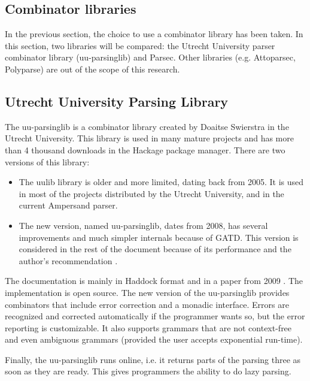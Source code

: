 \subsection{Combinator libraries}
In the previous section, the choice to use a combinator library has been taken.
In this section, two libraries will be compared: the Utrecht University parser combinator library (uu-parsinglib) and Parsec.
Other libraries (e.g. Attoparsec, Polyparse) are out of the scope of this research.

\subsection{Utrecht University Parsing Library}
%
%
%
The uu-parsinglib is a combinator library created by Doaitse Swierstra in the Utrecht University.
This library is used in many mature projects and has more than 4 thousand downloads in the Hackage package manager.
There are two versions of this library:
\begin{itemize}
  \item The uulib library is older and more limited, dating back from 2005.
    It is used in most of the projects distributed by the Utrecht University, and in the current Ampersand parser.
  \item The new version, named uu-parsinglib, dates from 2008, has several improvements and much simpler internals because of GATD.
    This version is considered in the rest of the document because of its performance  and the author's recommendation .
\end{itemize}
%
The documentation is mainly in Haddock format and in a paper from 2009 .
The implementation is open source.
The new version of the uu-parsinglib provides combinators that include error correction and a monadic interface.
Errors are recognized and corrected automatically if the programmer wants so, but the error reporting is customizable.
It also supports grammars that are not context-free and even ambiguous grammars (provided the user accepts exponential run-time).

Finally, the uu-parsinglib runs online, i.e. it returns parts of the parsing three as soon as they are ready.
This gives programmers the ability to do lazy parsing.

